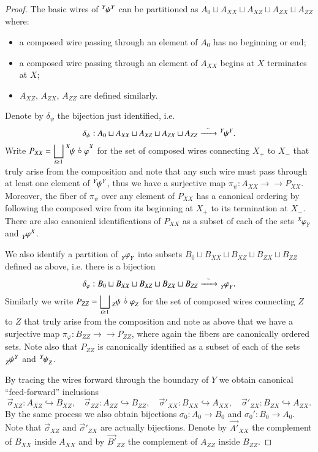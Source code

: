 \documentclass{amsart}
\def\to{\rightarrow}
\newcommand{\into}{\hookrightarrow}
\newcommand{\onto}{\to\!\!\!\!\!\to}
\newcommand{\Too}[1]{\xrightarrow{\ \ #1\ \ }}
\newcommand{\inp}[1]{{#1_-}}
\newcommand{\outp}[1]{{#1_+}}
\newcommand{\feeddd}[3]{{\tensor*[^{#2}_{\color{white}{!}}]{{#1}}{^{#3}}}}%
\newcommand{\feeddc}[3]{{\tensor*[^{#2}]{{#1}}{_{#3}}}}
\newcommand{\feedcd}[3]{{\tensor*[_{#2}]{{#1}}{^{#3}}}}
\newcommand{\feedcc}[3]{{\tensor*[^{\color{white}{!}}_{#2}]{{#1}}{_{#3}}}}
\theoremstyle{remark}
\theoremstyle{definition}
\begin{document}
\begin{proof}
The basic wires of $\feeddd{\psi}{Y}{Y}$ can be partitioned as $A_0\sqcup A_{XX}\sqcup A_{XZ}\sqcup A_{ZX}\sqcup A_{ZZ}$ where: 
\begin{itemize}
 \item a composed wire passing through an element of $A_0$ has no beginning or end;
 \item a composed wire passing through an element of $A_{XX}$ begins at $X$ terminates at $X$;
 \item $A_{XZ}$, $A_{ZX}$, $A_{ZZ}$ are defined similarly.
\end{itemize}
Denote by $\delta_\psi$ the bijection just identified, i.e.
\[\delta_\psi:A_0\sqcup A_{XX}\sqcup A_{XZ}\sqcup A_{ZX}\sqcup A_{ZZ}\Too{\sim}\feeddd{\psi}{Y}{Y}.\]
Write $P_{XX}=\displaystyle\bigsqcup_{i\ge1}\feeddd{\psi\;\accentset{i}{\circ}\;\varphi}{X}{X}$ for the set of composed wires connecting $\outp{X}$ to $\inp{X}$ that truly arise from the composition and note that any such wire must pass through at least one element of $\feeddd{\psi}{Y}{Y}$, thus we have a surjective map $\pi_\psi:A_{XX}\onto P_{XX}$.  Moreover, the fiber of $\pi_\psi$ over any element of $P_{XX}$ has a canonical ordering by following the composed wire from its beginning at $\outp{X}$ to its termination at $\inp{X}$.  There are also canonical identifications of $P_{XX}$ as a subset of each of the sets $\feeddc{\varphi}{X}{Y}$ and $\feedcd{\varphi}{Y}{X}$.

We also identify a partition of $\feedcc{\varphi}{Y}{Y}$ into subsets $B_0\sqcup B_{XX}\sqcup B_{XZ}\sqcup B_{ZX}\sqcup B_{ZZ}$ defined as above, i.e. there is a bijection
\[\delta_\varphi:B_0\sqcup B_{XX}\sqcup B_{XZ}\sqcup B_{ZX}\sqcup B_{ZZ}\Too{\sim}\feedcc{\varphi}{Y}{Y}.\]
Similarly we write $P_{ZZ}=\displaystyle\bigsqcup_{i\ge1}\feedcc{\psi\;\accentset{i}{\circ}\;\varphi}{Z}{Z}$ for the set of composed wires connecting $Z$ to $Z$ that truly arise from the composition and note as above that we have a surjective map $\pi_\varphi:B_{ZZ}\onto P_{ZZ}$, where again the fibers are canonically ordered sets.  Note also that $P_{ZZ}$ is canonically identified as a subset of each of the sets $\feedcd{\psi}{Z}{Y}$ and $\feeddc{\psi}{Y}{Z}$. 

By tracing the wires forward through the boundary of $Y$ we obtain canonical ``feed-forward'' inclusions
\[\vec{\sigma}_{XZ}:A_{XZ}\into B_{XZ},\quad \vec{\sigma}_{ZZ}:A_{ZZ}\into B_{ZZ},\quad \vec{\sigma}'_{XX}:B_{XX}\into A_{XX},\quad \vec{\sigma}'_{ZX}:B_{ZX}\into A_{ZX}.\]
By the same process we also obtain bijections $\sigma_0:A_0\to B_0$ and $\sigma_0':B_0\to A_0$.  Note that $\vec{\sigma}_{XZ}$ and $\vec{\sigma}'_{ZX}$ are actually bijections.  Denote by $\vec{A'}_{XX}$ the complement of $B_{XX}$ inside $A_{XX}$ and by $\vec{B'}_{ZZ}$ the complement of $A_{ZZ}$ inside $B_{ZZ}$.  


\end{proof}
\end{document}
